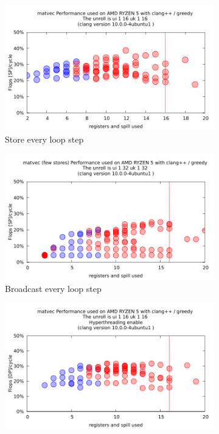 \documentclass{article}
\begin{document}
\begin{figure}[h!]
  \begin{subfigure}[h]{0.5\textwidth}  
  \includegraphics[width=\textwidth]{../autobench/datas/matvec/matvec_ui_1_16_uk_1_16.pdf}
  \caption{Store every loop step}
  \end{subfigure}
  \begin{subfigure}[h]{0.5\textwidth}  
  \includegraphics[width=\textwidth]{../autobench/datas/matvec_fewstores/matvec_fewstores_ui_1_32_uk_1_32.pdf}
  \caption{Broadcast every loop step}
  \end{subfigure}
  \begin{subfigure}[h]{0.5\textwidth}  
  \includegraphics[width=\textwidth]{../autobench/datas/matvec/threading/matvec_ui_1_16_uk_1_16_hyper_threading.pdf}

\end{subfigure}
\end{figure}
\end{document}
